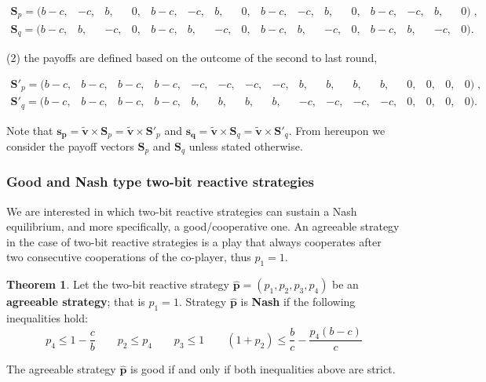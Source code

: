 \documentclass{article}
\theoremstyle{definition}
\newtheorem{theorem}{Theorem}[section]
\begin{document}
\begin{equation}\label{eq:last_round_two_bits}
  \begin{array}{*{16}{c}}
    \mathbf{S}_{p} = ( b - c , & -c , & b , & 0 , & b - c , & -c , & b , & 0 , & b - c , & -c , & b , & 0 , & b - c , & -c , & b , & 0)  \;, \\
    \mathbf{S}_{q} = ( b - c, & b, & -c, & 0, & b - c, & b, & -c, & 0, & b - c, & b, & -c, & 0, & b - c, & b, & -c, & 0).
  \end{array}
\end{equation}

(2) the payoffs are defined based on the outcome of the second to last round,

\begin{equation}\label{eq:second_to_last_round_two_bits}
  \begin{array}{*{16}{c}}
    \mathbf{S}'_{p} = (b - c, & b - c, & b - c, & b - c, & -c, & -c, & -c, & -c, & b, & b, & b, & b, & 0, & 0, & 0, & 0)  \;, \\
    \mathbf{S}'_{q} = (b - c, & b - c, & b - c, & b - c, & b, & b, & b, & b, & -c, & -c, & -c, & -c, & 0, & 0, & 0, & 0).
  \end{array}
\end{equation}

Note that \(\mathbf{s_{p}} = \mathbf{\tilde{v}} \times \mathbf{S}_{p} =
\mathbf{\tilde{v}} \times \mathbf{S}'_{p}\) and \(\mathbf{s_{q}} =\mathbf{\tilde{v}}
\times \mathbf{S}_{q} = \mathbf{\tilde{v}} \times \mathbf{S}'_{q}\). From
hereupon we consider the payoff vectors \(\mathbf{S}_{p}\) and
\(\mathbf{S}_{q}\) unless stated otherwise.

\subsubsection{Good and Nash type two-bit reactive strategies}

We are interested in which two-bit reactive strategies can sustain a Nash
equilibrium, and more specifically, a good/cooperative one. An agreeable strategy in
the case of two-bit reactive strategies is a play that always cooperates after
two consecutive cooperations of the co-player, thus \(p_1 = 1\).

\begin{theorem}

Let the two-bit reactive strategy \(\mathbf{\hat{p}} = (p_{1}, p_{2}, p_{3}, p_{4})\) be an \textbf{agreeable
strategy}; that is \(p_1 = 1\). Strategy \(\mathbf{\hat{p}}\) is \textbf{Nash} if the
following inequalities hold:
\begin{equation*}
    p_4 \leq 1 - \frac{c}{b} \qquad  p_2  \leq p_4 \qquad p_3 \leq 1 \qquad (1 + p_2) \leq \frac{b}{c} - \frac{p_4 (b - c)}{c}
\end{equation*}

The agreeable strategy \(\mathbf{\hat{p}}\) is good if and only if both inequalities above are strict.
\end{theorem}
\end{document}
